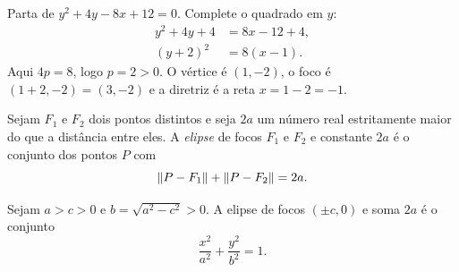 \documentclass[11pt,a4paper]{article}
\begin{document}
\begin{exemplo}
Parta de $y^2+4y-8x+12=0$. Complete o quadrado em $y$:
\begin{align*}
y^2+4y+4&=8x-12+4,\\
(y+2)^2&=8(x-1).
\end{align*}
Aqui $4p=8$, logo $p=2>0$. O vértice é $(1,-2)$, o foco é $(1+2,-2)=(3,-2)$ e a diretriz é a reta $x=1-2=-1$.
\end{exemplo}

\begin{definicao}
Sejam $F_1$ e $F_2$ dois pontos distintos e seja $2a$ um número real estritamente maior do que a distância entre eles. A \emph{elipse} de focos $F_1$ e $F_2$ e constante $2a$ é o conjunto dos pontos $P$ com
\[
\left\lVert P-F_1 \right\rVert+\left\lVert P-F_2 \right\rVert=2a.
\]
\end{definicao}

\begin{teorema}\label{teo:elipse}
Sejam $a>c>0$ e $b=\sqrt{a^2-c^2}>0$. A elipse de focos $(\pm c,0)$ e soma $2a$ é o conjunto
\[
\frac{x^2}{a^2}+\frac{y^2}{b^2}=1.
\]
\end{teorema}
\end{document}
